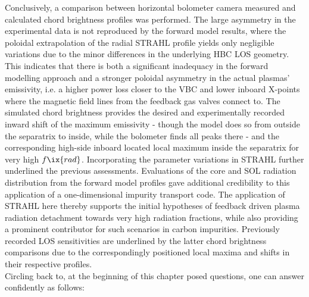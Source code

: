         Conclusively, a comparison between horizontal bolometer camera measured and calculated chord brightness profiles was performed. The large asymmetry in the experimental data is not reproduced by the forward model results, where the poloidal extrapolation of the radial STRAHL profile yields only negligible variations due to the minor differences in the underlying HBC LOS geometry. This indicates that there is both a significant inadequacy in the forward modelling approach and a stronger poloidal asymmetry in the actual plasmas' emissivity, i.e. a higher power loss closer to the VBC and lower inboard X-points where the magnetic field lines from the feedback gas valves connect to. The simulated chord brightness provides the desired and experimentally recorded inward shift of the maximum emissivity - though the model does so from outside the separatrix to inside, while the bolometer finds all peaks there - and the corresponding high-side inboard located local maximum inside the separatrix for very high $f\ix{rad}$. Incorporating the parameter variations in STRAHL further underlined the previous assessments. Evaluations of the core and SOL radiation distribution from the forward model profiles gave additional credibility to this application of a one-dimensional impurity transport code. The application of STRAHL here thereby supports the initial hypotheses of feedback driven plasma radiation detachment towards very high radiation fractions, while also providing a prominent contributor for such scenarios in carbon impurities. Previously recorded LOS sensitivities are underlined by the latter chord brightness comparisons due to the correspondingly positioned local maxima and shifts in their respective profiles.\\%
        Circling back to, at the beginning of this chapter posed questions, one can answer confidently as follows:%
%
